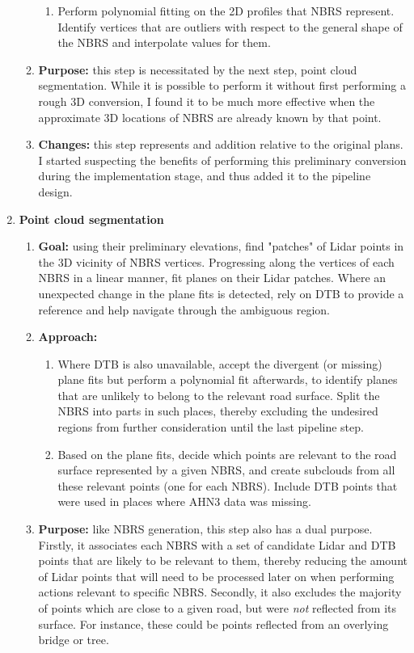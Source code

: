 \begin{enumerate}
\begin{enumerate}
\begin{enumerate}
            \item Perform polynomial fitting on the 2D profiles that NBRS represent. Identify vertices that are outliers with respect to the general shape of the NBRS and interpolate values for them.
        \end{enumerate}
        \item \textbf{Purpose:} this step is necessitated by the next step, point cloud segmentation. While it is possible to perform it without first performing a rough 3D conversion, I found it to be much more effective when the approximate 3D locations of NBRS are already known by that point.
        \item \textbf{Changes:} this step represents and addition relative to the original plans. I started suspecting the benefits of performing this preliminary conversion during the implementation stage, and thus added it to the pipeline design.
    \end{enumerate}
    \item \textbf{Point cloud segmentation}
    \begin{enumerate}
        \item \textbf{Goal:} using their preliminary elevations, find "patches" of Lidar points in the 3D vicinity of NBRS vertices. Progressing along the vertices of each NBRS in a linear manner, fit planes on their Lidar patches. Where an unexpected change in the plane fits is detected, rely on DTB to provide a reference and help navigate through the ambiguous region.
        \item \textbf{Approach:}
        \begin{enumerate}
            \item Where DTB is also unavailable, accept the divergent (or missing) plane fits but perform a polynomial fit afterwards, to identify planes that are unlikely to belong to the relevant road surface. Split the NBRS into parts in such places, thereby excluding the undesired regions from further consideration until the last pipeline step. 
            \item Based on the plane fits, decide which points are relevant to the road surface represented by a given NBRS, and create subclouds from all these relevant points (one for each NBRS). Include DTB points that were used in places where AHN3 data was missing.
        \end{enumerate}
        \item \textbf{Purpose:} like NBRS generation, this step also has a dual purpose. Firstly, it associates each NBRS with a set of candidate Lidar and DTB points that are likely to be relevant to them, thereby reducing the amount of Lidar points that will need to be processed later on when performing actions relevant to specific NBRS. Secondly, it also excludes the majority of points which are close to a given road, but were \textit{not} reflected from its surface. For instance, these could be points reflected from an overlying bridge or tree.

\end{enumerate}
\end{enumerate}
